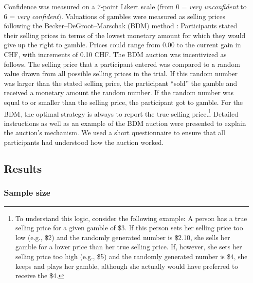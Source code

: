 \documentclass[a4paper, man, natbib, floatsintext]{apa6} %
\begin{document}
Confidence was measured on a 7-point Likert scale (from 0 = \textit{very unconfident} to 6 = \textit{very confident}). Valuations of gambles were measured as selling prices following the Becker--DeGroot--Marschak (BDM) method \citep{Becker1964}: Participants stated their selling prices in terms of the lowest monetary amount for which they would give up the right to gamble. Prices could range from 0.00 to the current gain in CHF, with increments of 0.10 CHF. The BDM auction was incentivized as follows. The selling price that a participant entered was compared to a random value drawn from all possible selling prices in the trial. If this random number was larger than the stated selling price, the participant ``sold'' the gamble and received a monetary amount  the random number. If the random number was equal to or smaller than the selling price, the participant got to gamble. For the BDM, the optimal strategy is always to report the true selling price.\footnote{\label{logic.BDM} 
To understand this logic, consider the following example: A person has a true selling price for a given gamble of \$3. If this person sets her selling price too low (e.g., \$2) and the randomly generated number is \$2.10, she sells her gamble for a lower price than her true selling price. If, however, she sets her selling price too high (e.g., \$5) and the randomly generated number is \$4, she keeps and plays her gamble, although she actually would have preferred to receive the \$4.
} Detailed instructions as well as an example of the BDM auction were presented to explain the auction's mechanism. We used a short questionnaire to ensure that all participants had understood how the auction worked.

\subsection{Results}


\subsubsection{Sample size}
\end{document}

